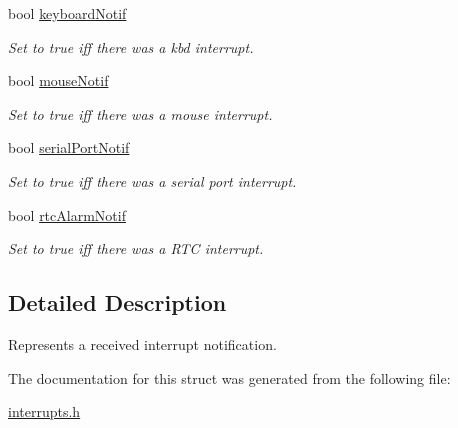 \begin{DoxyCompactItemize}
bool \mbox{\hyperlink{group__interrupts_ga9bcd8935448dbeb1714a51b8af36c929}{keyboard\+Notif}}
\begin{DoxyCompactList}\small\item\em Set to true iff there was a kbd interrupt. \end{DoxyCompactList}\item 
bool \mbox{\hyperlink{group__interrupts_ga033b89a1119cf0bf3dea6ba7d9ef1373}{mouse\+Notif}}
\begin{DoxyCompactList}\small\item\em Set to true iff there was a mouse interrupt. \end{DoxyCompactList}\item 
bool \mbox{\hyperlink{group__interrupts_ga9776a545df6ef8cc680149db59bd8c1c}{serial\+Port\+Notif}}
\begin{DoxyCompactList}\small\item\em Set to true iff there was a serial port interrupt. \end{DoxyCompactList}\item 
bool \mbox{\hyperlink{group__interrupts_ga429c938e843b61640cb0100efcef89da}{rtc\+Alarm\+Notif}}
\begin{DoxyCompactList}\small\item\em Set to true iff there was a R\+TC interrupt. \end{DoxyCompactList}\end{DoxyCompactItemize}


\subsection{Detailed Description}
Represents a received interrupt notification. 

The documentation for this struct was generated from the following file\+:\begin{DoxyCompactItemize}
\item 
\mbox{\hyperlink{interrupts_8h}{interrupts.\+h}}\end{DoxyCompactItemize}
